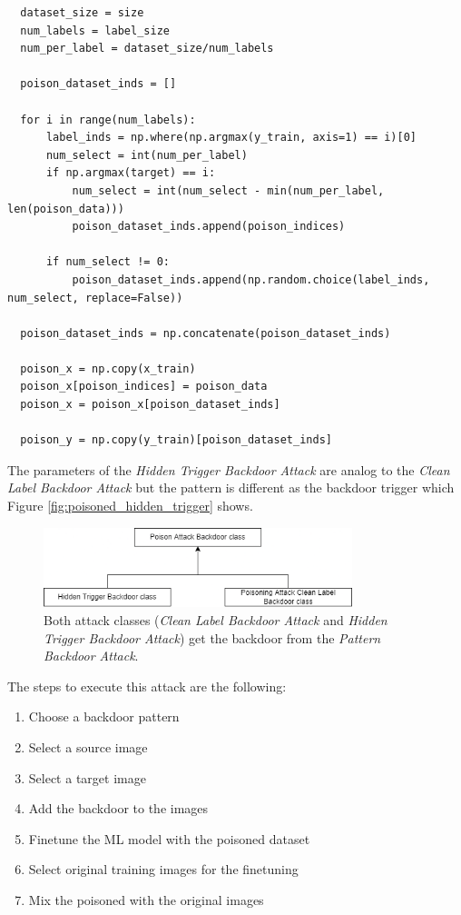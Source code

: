 \begin{lstlisting}
  dataset_size = size
  num_labels = label_size
  num_per_label = dataset_size/num_labels

  poison_dataset_inds = []

  for i in range(num_labels):
      label_inds = np.where(np.argmax(y_train, axis=1) == i)[0]
      num_select = int(num_per_label)
      if np.argmax(target) == i:
          num_select = int(num_select - min(num_per_label, len(poison_data)))
          poison_dataset_inds.append(poison_indices)

      if num_select != 0:
          poison_dataset_inds.append(np.random.choice(label_inds, num_select, replace=False))

  poison_dataset_inds = np.concatenate(poison_dataset_inds)

  poison_x = np.copy(x_train)
  poison_x[poison_indices] = poison_data
  poison_x = poison_x[poison_dataset_inds]

  poison_y = np.copy(y_train)[poison_dataset_inds]
\end{lstlisting}

The parameters of the \textit{Hidden Trigger Backdoor Attack} are analog to the \textit{Clean Label Backdoor Attack} but the pattern is different as the backdoor trigger which Figure \ref{fig:poisoned_hidden_trigger} shows.

\begin{figure}[ht!]
  \centering
  \includegraphics[width=9cm]{pictures/attack_relationship.png}
  \caption{Both attack classes (\textit{Clean Label Backdoor Attack} and \textit{Hidden Trigger Backdoor Attack}) get the backdoor from the \textit{Pattern Backdoor Attack}.}
  \label{fig:attack_relationship}
\end{figure}

The steps to execute this attack are the following: \\

\begin{enumerate}
  \item Choose a backdoor pattern
  \item Select a source image
  \item Select a target image
  \item Add the backdoor to the images
  \item Finetune the ML model with the poisoned dataset
  \item Select original training images for the finetuning
  \item Mix the poisoned with the original images
\end{enumerate}

